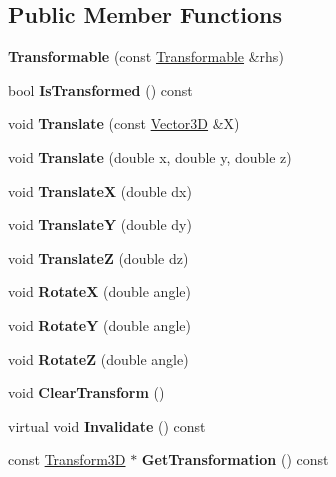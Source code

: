 \subsection*{Public Member Functions}
\begin{DoxyCompactItemize}
\item 
\mbox{\label{classTransformable_a230f0045a473890a2a73443495506077}} 
{\bfseries Transformable} (const \hyperlink{classTransformable}{Transformable} \&rhs)
\item 
\mbox{\label{classTransformable_a89a35fc319377d200d04ff5557a0c4ea}} 
bool {\bfseries Is\+Transformed} () const
\item 
\mbox{\label{classTransformable_abee0fae70ede2db642c8269e8a74e66f}} 
void {\bfseries Translate} (const \hyperlink{classTVec3D}{Vector3D} \&X)
\item 
\mbox{\label{classTransformable_ae95315bccb43a3636e57893e2ec3db57}} 
void {\bfseries Translate} (double x, double y, double z)
\item 
\mbox{\label{classTransformable_a2434c40fce0d5fdcf5717771fc5f0dc0}} 
void {\bfseries TranslateX} (double dx)
\item 
\mbox{\label{classTransformable_a257613ba4b3f827049463c3cab8c7a3f}} 
void {\bfseries TranslateY} (double dy)
\item 
\mbox{\label{classTransformable_aed0154e55271945164063e4062993a45}} 
void {\bfseries TranslateZ} (double dz)
\item 
\mbox{\label{classTransformable_a20b9e872b8c350a32a0b5ec42a60deaa}} 
void {\bfseries RotateX} (double angle)
\item 
\mbox{\label{classTransformable_acddd55ff9e77cd0de5b90a026f7229ee}} 
void {\bfseries RotateY} (double angle)
\item 
\mbox{\label{classTransformable_a933176615e712fbd57ad4c03830d1fdf}} 
void {\bfseries RotateZ} (double angle)
\item 
\mbox{\label{classTransformable_a7addb96094448416e66f48d4c19e937b}} 
void {\bfseries Clear\+Transform} ()
\item 
\mbox{\label{classTransformable_a3b9f81c2ee0eb3f18ca91d470b10874f}} 
virtual void {\bfseries Invalidate} () const
\item 
\mbox{\label{classTransformable_ae23218a2209397164b1c5d3719c9cd41}} 
const \hyperlink{classTransform3D}{Transform3D} $\ast$ {\bfseries Get\+Transformation} () const
\end{DoxyCompactItemize}
